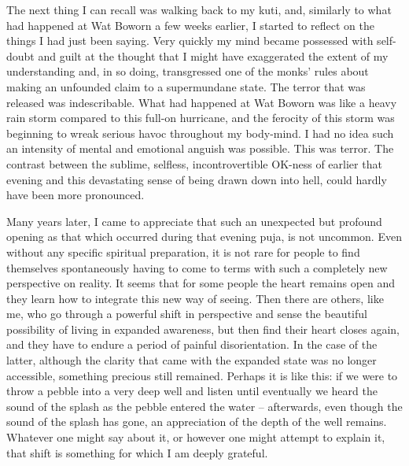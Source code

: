 The next thing I can recall was walking back to my kuti, and, similarly
to what had happened at Wat Boworn a few weeks earlier, I started to
reflect on the things I had just been saying. Very quickly my mind
became possessed with self-doubt and guilt at the thought that I might
have exaggerated the extent of my understanding and, in so doing,
transgressed one of the monks' rules about making an unfounded claim to
a supermundane state. The terror that was released was indescribable.
What had happened at Wat Boworn was like a heavy rain storm compared to
this full-on hurricane, and the ferocity of this storm was beginning to
wreak serious havoc throughout my body-mind. I had no idea such an
intensity of mental and emotional anguish was possible. This was terror.
The contrast between the sublime, selfless, incontrovertible OK-ness of
earlier that evening and this devastating sense of being drawn down into
hell, could hardly have been more pronounced.

Many years later, I came to appreciate that such an unexpected but
profound opening as that which occurred during that evening puja, is not
uncommon. Even without any specific spiritual preparation, it is not
rare for people to find themselves spontaneously having to come to terms
with such a completely new perspective on reality. It seems that for
some people the heart remains open and they learn how to integrate this
new way of seeing. Then there are others, like me, who go through a
powerful shift in perspective and sense the beautiful possibility of
living in expanded awareness, but then find their heart closes again,
and they have to endure a period of painful disorientation. In the case
of the latter, although the clarity that came with the expanded state
was no longer accessible, something precious still remained. Perhaps it
is like this: if we were to throw a pebble into a very deep well and
listen until eventually we heard the sound of the splash as the pebble
entered the water -- afterwards, even though the sound of the splash has
gone, an appreciation of the depth of the well remains. Whatever one
might say about it, or however one might attempt to explain it, that
shift is something for which I am deeply grateful.

